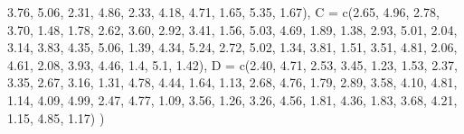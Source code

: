 \documentclass[
]{book}
\newenvironment{Shaded}{\begin{snugshade}}{\end{snugshade}}
\newcommand{\AttributeTok}[1]{\textcolor[rgb]{0.77,0.63,0.00}{#1}}
\newcommand{\FloatTok}[1]{\textcolor[rgb]{0.00,0.00,0.81}{#1}}
\newcommand{\FunctionTok}[1]{\textcolor[rgb]{0.00,0.00,0.00}{#1}}
\newcommand{\NormalTok}[1]{#1}
\begin{document}
\begin{Shaded}
\begin{Highlighting}[]
         \FloatTok{3.76}\NormalTok{, }\FloatTok{5.06}\NormalTok{, }\FloatTok{2.31}\NormalTok{, }\FloatTok{4.86}\NormalTok{, }\FloatTok{2.33}\NormalTok{, }\FloatTok{4.18}\NormalTok{, }\FloatTok{4.71}\NormalTok{, }\FloatTok{1.65}\NormalTok{, }\FloatTok{5.35}\NormalTok{, }\FloatTok{1.67}\NormalTok{),}
  \AttributeTok{C =}  \FunctionTok{c}\NormalTok{(}\FloatTok{2.65}\NormalTok{, }\FloatTok{4.96}\NormalTok{, }\FloatTok{2.78}\NormalTok{, }\FloatTok{3.70}\NormalTok{, }\FloatTok{1.48}\NormalTok{, }\FloatTok{1.78}\NormalTok{, }\FloatTok{2.62}\NormalTok{, }\FloatTok{3.60}\NormalTok{, }\FloatTok{2.92}\NormalTok{, }\FloatTok{3.41}\NormalTok{,}
         \FloatTok{1.56}\NormalTok{, }\FloatTok{5.03}\NormalTok{, }\FloatTok{4.69}\NormalTok{, }\FloatTok{1.89}\NormalTok{, }\FloatTok{1.38}\NormalTok{, }\FloatTok{2.93}\NormalTok{, }\FloatTok{5.01}\NormalTok{, }\FloatTok{2.04}\NormalTok{, }\FloatTok{3.14}\NormalTok{, }\FloatTok{3.83}\NormalTok{,}
         \FloatTok{4.35}\NormalTok{, }\FloatTok{5.06}\NormalTok{, }\FloatTok{1.39}\NormalTok{, }\FloatTok{4.34}\NormalTok{, }\FloatTok{5.24}\NormalTok{, }\FloatTok{2.72}\NormalTok{, }\FloatTok{5.02}\NormalTok{, }\FloatTok{1.34}\NormalTok{, }\FloatTok{3.81}\NormalTok{, }\FloatTok{1.51}\NormalTok{, }
         \FloatTok{3.51}\NormalTok{, }\FloatTok{4.81}\NormalTok{, }\FloatTok{2.06}\NormalTok{, }\FloatTok{4.61}\NormalTok{, }\FloatTok{2.08}\NormalTok{, }\FloatTok{3.93}\NormalTok{, }\FloatTok{4.46}\NormalTok{, }\FloatTok{1.4}\NormalTok{, }\FloatTok{5.1}\NormalTok{, }\FloatTok{1.42}\NormalTok{),}
  \AttributeTok{D =}  \FunctionTok{c}\NormalTok{(}\FloatTok{2.40}\NormalTok{, }\FloatTok{4.71}\NormalTok{, }\FloatTok{2.53}\NormalTok{, }\FloatTok{3.45}\NormalTok{, }\FloatTok{1.23}\NormalTok{, }\FloatTok{1.53}\NormalTok{, }\FloatTok{2.37}\NormalTok{, }\FloatTok{3.35}\NormalTok{, }\FloatTok{2.67}\NormalTok{, }\FloatTok{3.16}\NormalTok{,}
         \FloatTok{1.31}\NormalTok{, }\FloatTok{4.78}\NormalTok{, }\FloatTok{4.44}\NormalTok{, }\FloatTok{1.64}\NormalTok{, }\FloatTok{1.13}\NormalTok{, }\FloatTok{2.68}\NormalTok{, }\FloatTok{4.76}\NormalTok{, }\FloatTok{1.79}\NormalTok{, }\FloatTok{2.89}\NormalTok{, }\FloatTok{3.58}\NormalTok{,}
         \FloatTok{4.10}\NormalTok{, }\FloatTok{4.81}\NormalTok{, }\FloatTok{1.14}\NormalTok{, }\FloatTok{4.09}\NormalTok{, }\FloatTok{4.99}\NormalTok{, }\FloatTok{2.47}\NormalTok{, }\FloatTok{4.77}\NormalTok{, }\FloatTok{1.09}\NormalTok{, }\FloatTok{3.56}\NormalTok{, }\FloatTok{1.26}\NormalTok{, }
         \FloatTok{3.26}\NormalTok{, }\FloatTok{4.56}\NormalTok{, }\FloatTok{1.81}\NormalTok{, }\FloatTok{4.36}\NormalTok{, }\FloatTok{1.83}\NormalTok{, }\FloatTok{3.68}\NormalTok{, }\FloatTok{4.21}\NormalTok{, }\FloatTok{1.15}\NormalTok{, }\FloatTok{4.85}\NormalTok{, }\FloatTok{1.17}\NormalTok{)}
\NormalTok{)}
\end{Highlighting}
\end{Shaded}
\end{document}
